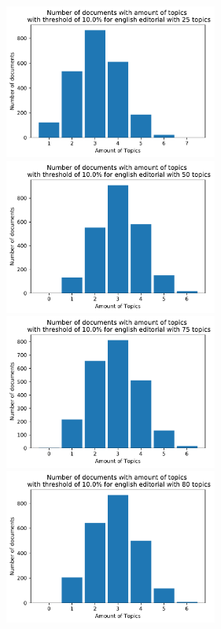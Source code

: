 \begin{figure}
	
	\begin{minipage}[t]{0.5\textwidth}
		\includegraphics[width=7cm]{gfx/GrafikenFinal/englisheditoriallda_topPerdoc25.pdf}
	\end{minipage}
	\begin{minipage}[t]{0.5\textwidth}
		\includegraphics[width=7cm]{gfx/GrafikenFinal/englisheditoriallda_topPerdoc50.pdf}
	\end{minipage}
	\begin{minipage}[t]{0.5\textwidth}
		\includegraphics[width=7cm]{gfx/GrafikenFinal/englisheditoriallda_topPerdoc75.pdf}
	\end{minipage}
	\begin{minipage}[t]{0.5\textwidth}
		\includegraphics[width=7cm]{gfx/GrafikenFinal/englisheditoriallda_topPerdoc80.pdf}

\end{minipage}
\end{figure}
